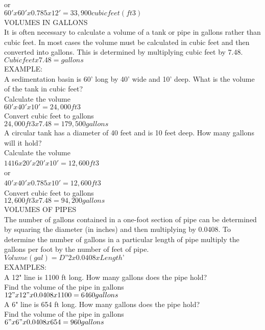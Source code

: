 \documentclass{article}
\begin{document}
or\\
$60' x 60' x 0.785 x 12' = 33,900 cubic feet (ft3)$\\
VOLUMES IN GALLONS\\
It is often necessary to calculate a volume of a tank or pipe in gallons rather than cubic feet. In most cases the volume must be calculated in cubic feet and then converted into gallons. This is determined by multiplying cubic feet by 7.48.\\
$Cubic feet x 7.48 = gallons$\\
EXAMPLE:\\
A sedimentation basin is 60' long by 40' wide and 10' deep. What is the volume of the tank in cubic feet?\\
Calculate the volume\\
$60' x 40' x10' = 24,000 ft3$\\
Convert cubic feet to gallons\\
$24,000 ft3 x 7.48 = 179,500 gallons$\\
A circular tank has a diameter of 40 feet and is 10 feet deep. How many gallons will it hold?\\
Calculate the volume\\
$1416 x 20' x 20' x 10' = 12,600 ft$3\\
or\\
$40' x 40' x 0.785 x 10' = 12,600 ft$3\\
Convert cubic feet to gallons\\
$12,600 ft3 x 7.48 = 94,200 gallons$\\
VOLUMES OF PIPES\\
The number of gallons contained in a one-foot section of pipe can be determined by squaring the diameter (in inches) and then multiplying by 0.0408. To determine the number of gallons in a particular length of pipe multiply the gallons per foot by the number of feet of pipe.\\
$Volume (gal) = D”2x 0.0408 x Length’$\\
EXAMPLES:\\
A 12" line is 1100 ft long. How many gallons does the pipe hold?\\
Find the volume of the pipe in gallons\\
$12" x 12" x 0.0408 x 1100 = 6460 gallons$\\
A 6" line is 654 ft long. How many gallons does the pipe hold?\\
Find the volume of the pipe in gallons\\
$6" x 6" x 0.0408 x 654 = 960 gallons$\\
\end{document}
